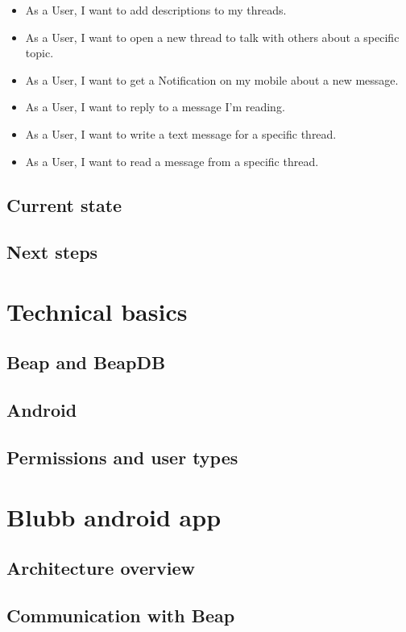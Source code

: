 \documentclass[12pt,a4paper,oneside]{report}
\begin{document}
\begin{itemize}
     \item As a User, I want to add descriptions to my threads.
     \item As a User, I want to open a new thread to talk with others about a specific topic.
     \item As a User, I want to get a Notification on my mobile about a new message.
     \item As a User, I want to reply to a message I'm reading.
     \item As a User, I want to write a text message for a specific thread.
     \item As a User, I want to read a message from a specific thread. 
   \end{itemize}
\section{Current state}

\section{Next steps}

\chapter{Technical basics}

\section{Beap and BeapDB}

\section{Android}

\section{Permissions and user types}

\chapter{Blubb android app}

\section{Architecture overview}

\section{Communication with Beap}
\end{document}
